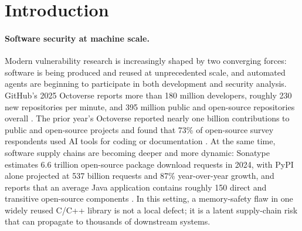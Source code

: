 \documentclass[sigconf,anonymous]{acmart}
\begin{document}
\maketitle

\section{Introduction}
\label{sec:intro}

\paragraph{Software security at machine scale.}
Modern vulnerability research is increasingly shaped by two converging
forces: software is being produced and reused at unprecedented scale, and
automated agents are beginning to participate in both development and
security analysis.  GitHub's 2025 Octoverse reports more than
180 million developers, roughly 230 new repositories per minute, and
395 million public and open-source repositories overall
\cite{github_octoverse_2025}.  The prior year's Octoverse reported
nearly one billion contributions to public and open-source projects and
found that 73\% of open-source survey respondents used AI tools for
coding or documentation \cite{github_octoverse_2024}.  At the same time,
software supply chains are becoming deeper and more dynamic: Sonatype
estimates 6.6 trillion open-source package download requests in 2024,
with PyPI alone projected at 537 billion requests and 87\% year-over-year
growth, and reports that an average Java application contains roughly
150 direct and transitive open-source components
\cite{sonatype_sscr_2024_scale}.  In this setting, a memory-safety flaw
in one widely reused C/C++ library is not a local defect; it is a latent
supply-chain risk that can propagate to thousands of downstream systems.
\end{document}
